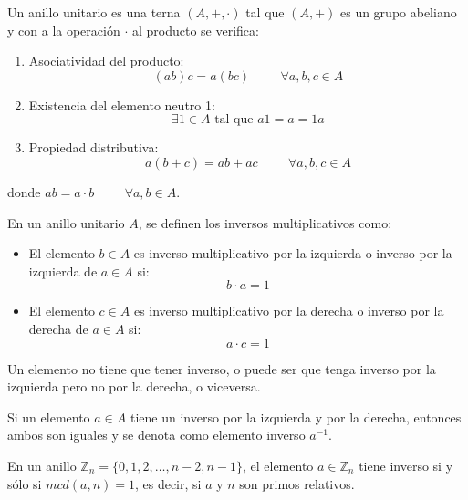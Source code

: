 \begin{definition}[Anillo]
    Un anillo unitario es una terna $(A, +, \cdot)$ tal que $(A, +)$ es un grupo abeliano y con a la operación $\cdot$ al producto se verifica:
    \begin{enumerate}
        \item Asociatividad del producto:
        $$(ab)c = a(bc) \hspace{1cm} \forall a, b, c \in A$$
        
        \item Existencia del elemento neutro 1:
        $$\exists 1 \in A \text{ tal que } a1 = a = 1a$$
        
        \item Propiedad distributiva:
        $$a (b + c) = ab + ac \hspace{1cm} \forall a, b, c \in A$$
    \end{enumerate}
donde $ab = a \cdot b \hspace{1cm} \forall a, b \in A$.
\end{definition}

\begin{definition}
En un anillo unitario $A$, se definen los inversos multiplicativos como:
\begin{itemize}
    \item El elemento $b \in A$ es inverso multiplicativo por la izquierda o inverso por la izquierda de $a \in A$ si:
    $$b \cdot a = 1$$
    \item El elemento $c \in A$ es inverso multiplicativo por la derecha o inverso por la derecha de $a \in A$ si:
    $$a \cdot c = 1$$
\end{itemize}

Un elemento no tiene que tener inverso, o puede ser que tenga inverso por la izquierda pero no por la derecha, o viceversa.

Si un elemento $a \in A$ tiene un inverso por la izquierda y por la derecha, entonces ambos son iguales y se denota como elemento inverso $a^{-1}$.

En un anillo $\mathbb{Z}_{n} = \{0, 1, 2, \dots, n-2, n-1\}$, el elemento $a \in \mathbb{Z}_{n}$ tiene inverso si y sólo si $mcd(a, n) = 1$, es decir, si $a$ y $n$ son primos relativos.
\end{definition}

